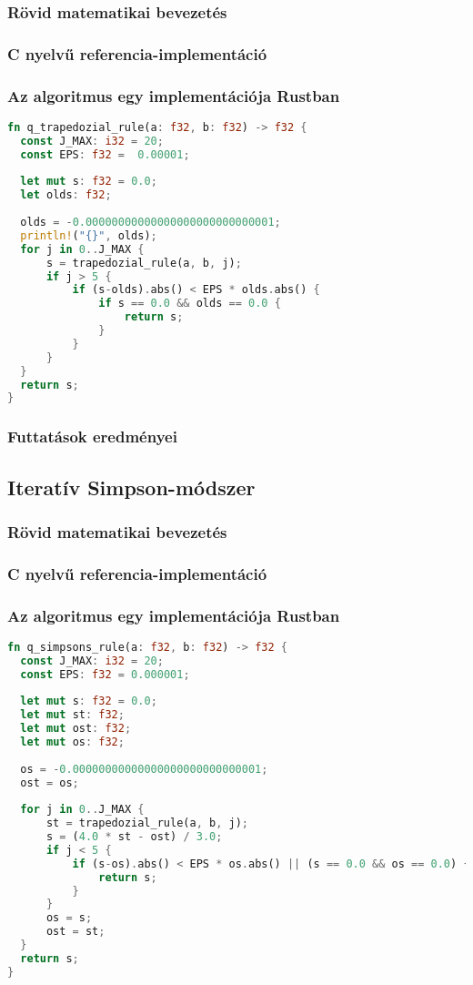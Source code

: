 \subsubsection{Rövid matematikai bevezetés}

\subsubsection{C nyelvű referencia-implementáció}
\subsubsection{Az algoritmus egy implementációja Rustban}
\begin{lstlisting}[language=Rust]
fn q_trapedozial_rule(a: f32, b: f32) -> f32 {
  const J_MAX: i32 = 20;
  const EPS: f32 =  0.00001;
  
  let mut s: f32 = 0.0;
  let olds: f32;
  
  olds = -0.00000000000000000000000000001;
  println!("{}", olds);
  for j in 0..J_MAX {
	  s = trapedozial_rule(a, b, j);
	  if j > 5 {
		  if (s-olds).abs() < EPS * olds.abs() {
			  if s == 0.0 && olds == 0.0 {
				  return s;
			  }
		  }
	  }
  }
  return s;
}
\end{lstlisting}

\subsubsection{Futtatások eredményei} %

\subsection{Iteratív Simpson-módszer}
\subsubsection{Rövid matematikai bevezetés}
\subsubsection{C nyelvű referencia-implementáció}
\subsubsection{Az algoritmus egy implementációja Rustban}
\begin{lstlisting}[language=Rust]
fn q_simpsons_rule(a: f32, b: f32) -> f32 {
  const J_MAX: i32 = 20;
  const EPS: f32 = 0.000001;
	  
  let mut s: f32 = 0.0;
  let mut st: f32;
  let mut ost: f32;
  let mut os: f32;
  
  os = -0.00000000000000000000000000001;
  ost = os;
  
  for j in 0..J_MAX {
	  st = trapedozial_rule(a, b, j);
	  s = (4.0 * st - ost) / 3.0;
	  if j < 5 {
		  if (s-os).abs() < EPS * os.abs() || (s == 0.0 && os == 0.0) {
			  return s;
		  }
	  }
	  os = s;
	  ost = st;
  }
  return s;
}
\end{lstlisting}
